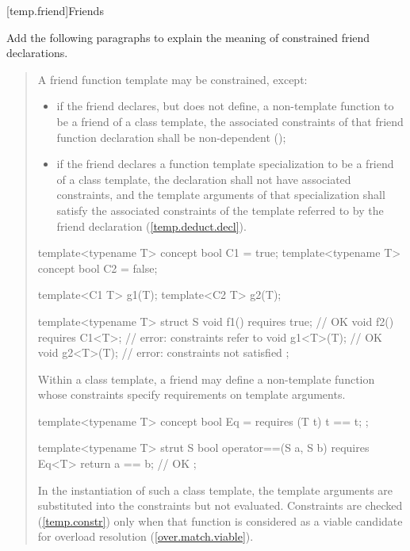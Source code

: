 \setcounter{subsection}{3}
[temp.friend]{Friends}

Add the following paragraphs to explain the meaning of constrained
friend declarations. 

\begin{quote}
\setcounter{Paras}{9}
\pnum
A friend function template may be constrained, except:
% 
\begin{itemize}
\item if the friend declares, but does not define, a non-template
function to be a friend of a class template, the associated constraints
of that friend function declaration shall be non-dependent
(); 
% 
\item if the friend declares a function template specialization to
be a friend of a class template, the declaration shall not have
associated constraints, and the template arguments of that specialization
shall satisfy the associated constraints of the template referred to
by the friend declaration (\ref{temp.deduct.decl}). 
\end{itemize}
% 
\enterexample
\begin{codeblock}
template<typename T> concept bool C1 = true;
template<typename T> concept bool C2 = false;

template<C1 T> g1(T);
template<C2 T> g2(T);

template<typename T>
  struct S {
    void f1() requires true;  // OK
    void f2() requires C1<T>; // error: constraints refer to 
    void g1<T>(T);            // OK
    void g2<T>(T);            // error: constraints not satisfied
  };
\end{codeblock}
\exitexample

\pnum
\enternote
Within a class template, a friend may define a non-template function
whose constraints specify requirements on template arguments.
\enterexample
\begin{codeblock}
template<typename T> concept bool Eq = requires (T t) { t == t; };

template<typename T>
  strut S {
    bool operator==(S a, S b) requires Eq<T> { return a == b; } // OK
  };
\end{codeblock}
\exitexample
In the instantiation of such a class template, the template
arguments are substituted into the constraints but not evaluated.
Constraints are checked (\ref{temp.constr}) only when
that function is considered as a viable candidate for overload resolution
(\ref{over.match.viable}).
\exitnote
\end{quote}


